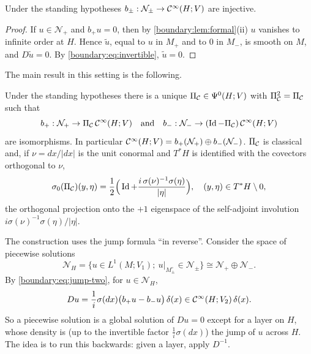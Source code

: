 \begin{lemma}\label{boundary:lem:unique}
Under the standing hypotheses $b_\pm:\mathcal{N}_\pm\to\mathcal{C}^\infty(H;V)$ are injective.
\end{lemma}
\begin{proof}
If $u\in\mathcal{N}_+$ and $b_+u=0$, then by \cref{boundary:lem:formal}(ii) $u$
vanishes to infinite order at $H$. Hence $\tilde u$, equal to $u$ in $M_+$ and to $0$
in $M_-$, is smooth on $M$, and $D\tilde u=0$. By \eqref{boundary:eq:invertible},
$\tilde u=0$.
\end{proof}

The main result in this setting is the following.

\begin{theorem}\label{boundary:thm:calderon-dividing}
Under the standing hypotheses there is a unique $\Pi_{\mathcal{C}}\in\Psi^{0}(H;V)$ with
$\Pi_{\mathcal{C}}^2=\Pi_{\mathcal{C}}$ such that
\begin{equation*}
b_+:\mathcal{N}_+\to\Pi_{\mathcal{C}}\,\mathcal{C}^\infty(H;V)\quad\text{and}\quad
b_-:\mathcal{N}_-\to(\operatorname{Id}-\Pi_{\mathcal{C}})\,\mathcal{C}^\infty(H;V)
\end{equation*}
are isomorphisms. In particular $\mathcal{C}^\infty(H;V)=b_+(\mathcal{N}_+)\oplus b_-(\mathcal{N}_-)$.
$\Pi_{\mathcal{C}}$ is classical and, if $\nu=dx/|dx|$ is the unit conormal and $T^*H$ is identified
with the covectors orthogonal to $\nu$,
\begin{equation}\label{boundary:eq:calderon-symbol}
\sigma_0(\Pi_{\mathcal{C}})(y,\eta)=\frac12\Big(\operatorname{Id}+\frac{i\,\sigma(\nu)^{-1}\sigma(\eta)}{|\eta|}
\Big),\quad(y,\eta)\in T^*H\setminus0,
\end{equation}
the orthogonal projection onto the $+1$ eigenspace of the self-adjoint involution
$i\sigma(\nu)^{-1}\sigma(\eta)/|\eta|$.
\end{theorem}

The construction uses the jump formula ``in reverse''. Consider the space of
piecewise solutions
\begin{equation*}
\mathcal{N}_H=\{u\in L^1(M;V_1);\ u|_{M_\pm^\circ}\in\mathcal{N}_\pm\}\cong
\mathcal{N}_+\oplus\mathcal{N}_-.
\end{equation*}
By \eqref{boundary:eq:jump-two}, for $u\in\mathcal{N}_H$,
\begin{equation}\label{boundary:eq:jump-solutions}
Du=\frac1i\sigma(dx)\big(b_+u-b_-u\big)\,\delta(x)\in\mathcal{C}^\infty(H;V_2)\,\delta(x).
\end{equation}
So a piecewise solution is a global solution of $Du=0$ except for a layer on $H$,
whose density is (up to the invertible factor $\frac1i\sigma(dx)$) the jump of $u$
across $H$. The idea is to run this backwards: given a layer, apply $D^{-1}$.

